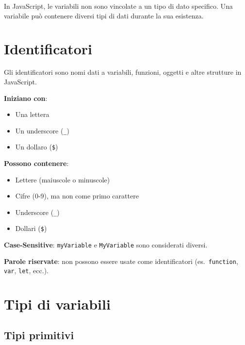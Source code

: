 In JavaScript, le variabili non sono vincolate a un tipo di dato specifico. Una variabile può contenere diversi tipi di dati durante la sua esistenza.

\section{Identificatori}

Gli identificatori sono nomi dati a variabili, funzioni, oggetti e altre strutture in JavaScript.

\textbf{Iniziano con}:
\begin{itemize}
    \item Una lettera
    \item Un underscore (\texttt{\_})
    \item Un dollaro (\texttt{\$})
\end{itemize}

\textbf{Possono contenere}:
\begin{itemize}
    \item Lettere (maiuscole o minuscole)
    \item Cifre (0-9), ma non come primo carattere
    \item Underscore (\texttt{\_})
    \item Dollari (\texttt{\$})
\end{itemize}

\textbf{Case-Sensitive}: \texttt{myVariable} e \texttt{MyVariable} sono considerati diversi.

\textbf{Parole riservate}: non possono essere usate come identificatori (es.\ \texttt{function}, \texttt{var}, \texttt{let}, ecc.).

\section{Tipi di variabili}

\subsection{Tipi primitivi}

